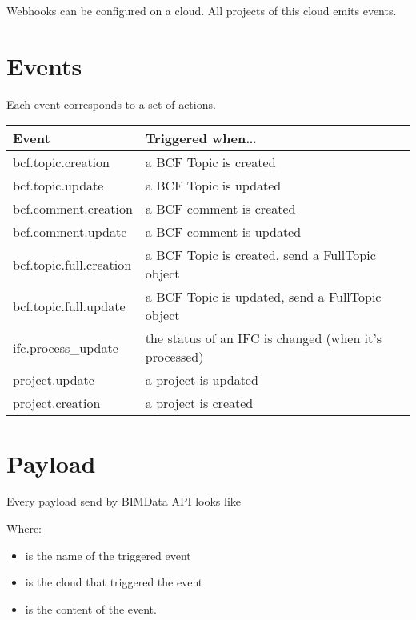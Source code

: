\documentclass[a4paper,12pt,english]{sphinxmanual}
\begin{document}
Webhooks can be configured on a cloud. All projects of this cloud emits events.


\section{Events}
\label{\detokenize{guide/webhooks:events}}
Each event corresponds to a set of actions.


\begin{savenotes}\sphinxattablestart
\centering
\begin{tabulary}{\linewidth}[t]{|T|T|}
\hline
\sphinxstyletheadfamily 
Event
&\sphinxstyletheadfamily 
Triggered when…
\\
\hline
bcf.topic.creation
&
a BCF Topic is created
\\
\hline
bcf.topic.update
&
a BCF Topic is updated
\\
\hline
bcf.comment.creation
&
a BCF comment is created
\\
\hline
bcf.comment.update
&
a BCF comment is updated
\\
\hline
bcf.topic.full.creation
&
a BCF Topic is created, send a FullTopic object
\\
\hline
bcf.topic.full.update
&
a BCF Topic is updated, send a FullTopic object
\\
\hline
ifc.process\_update
&
the status of an IFC is changed (when it’s processed)
\\
\hline
project.update
&
a project is updated
\\
\hline
project.creation
&
a project is created
\\
\hline
\end{tabulary}
\par
\sphinxattableend\end{savenotes}


\section{Payload}
\label{\detokenize{guide/webhooks:payload}}
Every payload send by BIMData API looks like

Where:
\begin{itemize}
\item {} 
 is the name of the triggered event

\item {} 
 is the cloud that triggered the event

\item {} 
 is the content of the event.

\end{itemize}
\end{document}
